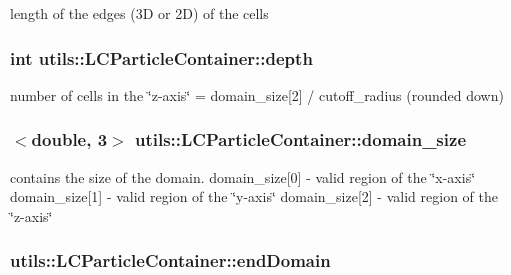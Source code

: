 length of the edges (3\-D or 2\-D) of the cells \hypertarget{classutils_1_1LCParticleContainer_a486b4cb6c669b107a5cbc76a0a115aa8}{
\subsubsection[{depth}]{\setlength{\rightskip}{0pt plus 5cm}int utils\-::\-L\-C\-Particle\-Container\-::depth\hspace{0.3cm}{\ttfamily [private]}}}\label{classutils_1_1LCParticleContainer_a486b4cb6c669b107a5cbc76a0a115aa8}
number of cells in the \char`\"{}z-\/axis\char`\"{} = domain\-\_\-size\mbox{[}2\mbox{]} / cutoff\-\_\-radius (rounded down) \hypertarget{classutils_1_1LCParticleContainer_a6d8c9f033d0045ba9cd4353f2c009486}{
\subsubsection[{domain\-\_\-size}]{$<$double, 3$>$ utils\-::\-L\-C\-Particle\-Container\-::domain\-\_\-size\hspace{0.3cm}{\ttfamily [private]}}}\label{classutils_1_1LCParticleContainer_a6d8c9f033d0045ba9cd4353f2c009486}
contains the size of the domain. domain\-\_\-size\mbox{[}0\mbox{]} -\/ valid region of the \char`\"{}x-\/axis\char`\"{} domain\-\_\-size\mbox{[}1\mbox{]} -\/ valid region of the \char`\"{}y-\/axis\char`\"{} domain\-\_\-size\mbox{[}2\mbox{]} -\/ valid region of the \char`\"{}z-\/axis\char`\"{} \hypertarget{classutils_1_1LCParticleContainer_ae5d7cfe4f3104c61a40f8c032e6f4ddc}{
\subsubsection[{end\-Domain}]{ utils\-::\-L\-C\-Particle\-Container\-::end\-Domain\hspace{0.3cm}{\ttfamily [private]}}}\label{classutils_1_1LCParticleContainer_ae5d7cfe4f3104c61a40f8c032e6f4ddc}
